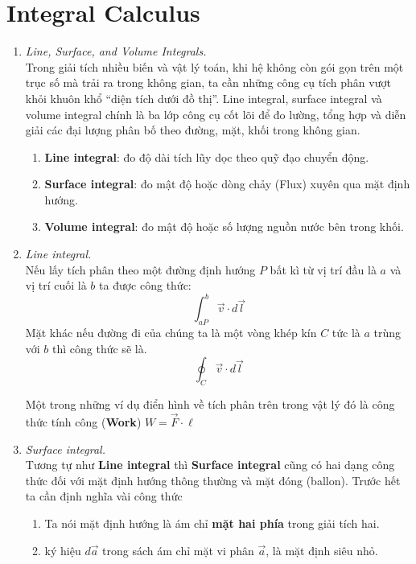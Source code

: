 \section{Integral Calculus}

\begin{enumerate}
    \item \textit{Line, Surface, and Volume Integrals.}\\
    Trong giải tích nhiều biến và vật lý toán, khi hệ không còn gói gọn trên một trục số mà trải ra trong không gian, ta cần những công cụ tích phân vượt khỏi khuôn khổ “diện tích dưới đồ thị”.
Line integral, surface integral và volume integral chính là ba lớp công cụ cốt lõi để đo lường, tổng hợp và diễn giải các đại lượng phân bố theo đường, mặt, khối trong không gian.
\begin{enumerate}[label=(\roman*)]
    \item \textbf{Line integral}: đo độ dài tích lũy dọc theo quỹ đạo chuyển động.\\
    \item \textbf{Surface integral}: đo mật độ hoặc dòng chảy (Flux) xuyên qua mặt định hướng.\\
    \item \textbf{Volume integral}: đo mật độ hoặc số lượng nguồn nước bên trong khối.
\end{enumerate}

    \item \textit{Line integral.}\\
    Nếu lấy tích phân theo một đường định hướng $P$ bất kì từ vị trí đầu là $a$ và vị trí cuối là $b$ ta được công thức:
\[
    \int_{aP}^{b} \vec{v} \cdot d\vec{l}
\]
    Mặt khác nếu đường đi của chúng ta là một vòng khép kín $C$ tức là $a$ trùng với $b$ thì công thức sẽ là.
\[
    \oint_{C} \vec{v} \cdot d\vec{l}
\]
\begin{example}
Một trong những ví dụ điển hình về tích phân trên trong vật lý đó là công thức tính công (\textbf{Work}) $W = \vec{F} \cdot \ell$
\end{example}
\item \textit{Surface integral.}\\
Tương tự như \textbf{Line integral} thì \textbf{Surface integral} cũng có hai dạng công thức đối với mặt định hướng thông thường và mặt đóng (ballon).
Trước hết ta cần định nghĩa vài công thức

\begin{enumerate}
  \item[(a)] Ta nói mặt định hướng là ám chỉ \textbf{mặt hai phía} trong giải tích hai.
  \item[(b)] ký hiệu $d \vec{a}$ trong sách ám chỉ mặt vi phân $\vec{a}$, là mặt định siêu nhỏ.
\end{enumerate}


\end{enumerate}
